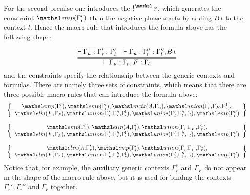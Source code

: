 For the second premise one introduces the $\nbang{r}$, which generates 
the constraint $\emp{\Gamma_l''}$ then the negative phase starts by 
adding $B\,t$ to the context $l$. Hence the macro-rule that introduces
the formula above has the following shape:
\[
 \infer={\vdash \Gamma_u : \Gamma_r, F : \Gamma_l}
{
\infer{\vdash \Gamma_u : \Gamma_r' : \Gamma_l'}{}
&
\vdash \Gamma_u : \Gamma_r'' : \Gamma_l'', B\,t
}
\]
and the constraints specify the relationship between the generic contexts 
and formulas. There are namely three sets of constraints, which means
that there are three possible macro-rules that can introduce the 
formula above:
\[
\begin{array}{c}
\left\{\begin{array}{c}
\emp{\Gamma_r'},\emp{\Gamma_l'}, \mctx{A}{\Gamma_u},
\union{\Gamma_r}{\Gamma_F}{\Gamma_r^1},\\
\elin{F}{\Gamma_F}, \union{\Gamma_r'}{\Gamma_r''}{\Gamma_r^1},
\union{\Gamma_l'}{\Gamma_l''}{\Gamma_l}, \emp{\Gamma_l''}
\end{array}\right\} \\\\

\left\{\begin{array}{c}
\emp{\Gamma_r'}, \elin{A}{\Gamma_l'},
\union{\Gamma_r}{\Gamma_F}{\Gamma_r^1},\\
\elin{F}{\Gamma_F}, \union{\Gamma_r'}{\Gamma_r''}{\Gamma_r^1},
\union{\Gamma_l'}{\Gamma_l''}{\Gamma_l}, \emp{\Gamma_l''}
\end{array}\right\} \\\\

\left\{\begin{array}{c}
\elin{A}{\Gamma_r'}, \emp{\Gamma_l'},
\union{\Gamma_r}{\Gamma_F}{\Gamma_r^1},\\
\elin{F}{\Gamma_F}, \union{\Gamma_r'}{\Gamma_r''}{\Gamma_r^1},
\union{\Gamma_l'}{\Gamma_l''}{\Gamma_l}, \emp{\Gamma_l''}
\end{array}\right\} 
\end{array}
\]
Notice that, for example, the auxiliary generic contexts $\Gamma_r^1$ and
$\Gamma_F$ do not appear in the shape of the macro-rule above, but it is
used for binding the contexts $\Gamma_r', \Gamma_r''$ and $\Gamma_r$
together. 

